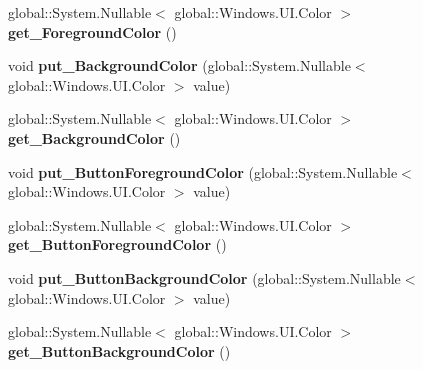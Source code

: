 \begin{DoxyCompactItemize}
global\+::\+System.\+Nullable$<$ global\+::\+Windows.\+U\+I.\+Color $>$ {\bfseries get\+\_\+\+Foreground\+Color} ()
\item 
\mbox{\label{class_windows_1_1_u_i_1_1_view_management_1_1_application_view_title_bar_a72763c5790a08759eb3aa7f1a034cc1c}} 
void {\bfseries put\+\_\+\+Background\+Color} (global\+::\+System.\+Nullable$<$ global\+::\+Windows.\+U\+I.\+Color $>$ value)
\item 
\mbox{\label{class_windows_1_1_u_i_1_1_view_management_1_1_application_view_title_bar_a10d72a066c2702f38e96eb1f3702b5ab}} 
global\+::\+System.\+Nullable$<$ global\+::\+Windows.\+U\+I.\+Color $>$ {\bfseries get\+\_\+\+Background\+Color} ()
\item 
\mbox{\label{class_windows_1_1_u_i_1_1_view_management_1_1_application_view_title_bar_a607b5d86c746c6283c118cc8e983990a}} 
void {\bfseries put\+\_\+\+Button\+Foreground\+Color} (global\+::\+System.\+Nullable$<$ global\+::\+Windows.\+U\+I.\+Color $>$ value)
\item 
\mbox{\label{class_windows_1_1_u_i_1_1_view_management_1_1_application_view_title_bar_aae493d2a3fa93365f753e29b776af821}} 
global\+::\+System.\+Nullable$<$ global\+::\+Windows.\+U\+I.\+Color $>$ {\bfseries get\+\_\+\+Button\+Foreground\+Color} ()
\item 
\mbox{\label{class_windows_1_1_u_i_1_1_view_management_1_1_application_view_title_bar_a4bf81ad5fba26dac4114c2caf024a7a9}} 
void {\bfseries put\+\_\+\+Button\+Background\+Color} (global\+::\+System.\+Nullable$<$ global\+::\+Windows.\+U\+I.\+Color $>$ value)
\item 
\mbox{\label{class_windows_1_1_u_i_1_1_view_management_1_1_application_view_title_bar_a7e47596433a77023cf07c95e096f0a1c}} 
global\+::\+System.\+Nullable$<$ global\+::\+Windows.\+U\+I.\+Color $>$ {\bfseries get\+\_\+\+Button\+Background\+Color} ()

\end{DoxyCompactItemize}
